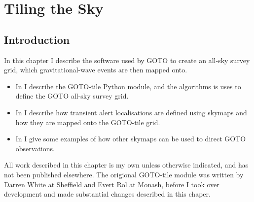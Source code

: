 \chapter{Tiling the Sky}
\label{chap:tiling}
\chaptoc{}


\newpage
\section{Introduction}
\label{sec:tiling_intro}
\begin{colsection}

In this chapter I describe the software used by GOTO to create an all-sky survey grid, which gravitational-wave events are then mapped onto.
%
\begin{itemize}
    \item In  I describe the GOTO-tile Python module, and the algorithms is uses to define the GOTO all-sky survey grid.
    \item In  I describe how transient alert localisations are defined using skymaps and how they are mapped onto the GOTO-tile grid.
    \item In  I give some examples of how other skymaps can be used to direct GOTO observations.
\end{itemize}
%
All work described in this chapter is my own unless otherwise indicated, and has not been published elsewhere. The origional GOTO-tile module was written by Darren White at Sheffield and Evert Rol at Monash, before I took over development and made substantial changes described in this chaper.

\end{colsection}


\newpage

